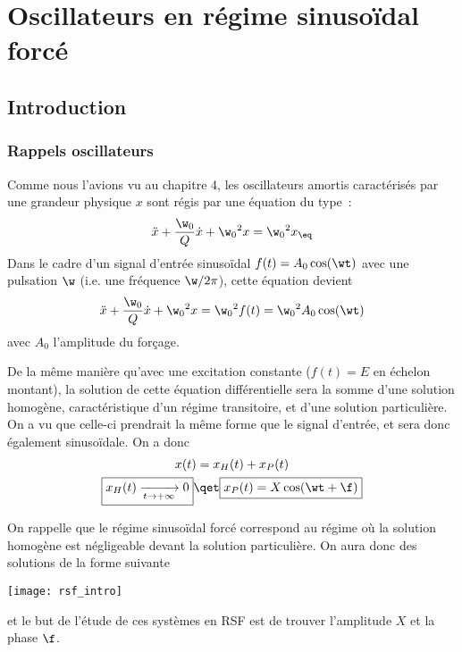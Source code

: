 \documentclass[../main/main.tex]{subfiles}
\begin{document}
\setcounter{chapter}{5}

\chapter{Oscillateurs en r\'egime sinuso\"idal forc\'e}

\section{Introduction}
\subsection{Rappels oscillateurs}

Comme nous l'avions vu au chapitre 4, les oscillateurs amortis caractérisés par
une grandeur physique $x$ sont régis par une équation du type~:
\[ \ddot{x} + \frac{\w_0}{Q} \dot{x} + \w_0{}^2x = \w_0{}^2x_{\eq}\]
Dans le cadre d'un signal d'entrée sinusoïdal $f(t) = A_0\cos(\wt)$ avec une
pulsation $\w$ (i.e. une fréquence $\w/2\pi$), cette équation devient
\[ \ddot{x} + \frac{\w_0}{Q} \dot{x} + \w_0{}^2x = \w_0{}^2f(t) = \w_0{}^2A_0\cos(\wt)\]
avec $A_0$ l'amplitude du forçage. \bigbreak

De la même manière qu'avec une excitation constante ($f(t) = E$ en échelon
montant), la solution de cette équation différentielle sera la somme d'une
solution homogène, caractéristique d'un régime transitoire, et d'une solution
particulière. On a vu que celle-ci prendrait la même forme que le signal
d'entrée, et sera donc également sinusoïdale. On a donc
\begin{gather*}
    x(t) = x_H(t) + x_P(t)\\
    \boxed{x_H(t) \xrightarrow[t\rightarrow+\infty]{} 0}
    \qet
    \boxed{x_P(t) = X\cos(\wt+\f)}
\end{gather*}

On rappelle que le régime sinusoïdal forcé correspond au régime où la solution
homogène est négligeable devant la solution particulière. On aura donc des
solutions de la forme suivante
\begin{center}
    \texttt{[image: rsf\_intro]}
\end{center}
et le but de l'étude de ces systèmes en RSF est de trouver l'amplitude $X$ et la
phase $\f$.

\vspace{-10pt}
\end{document}
